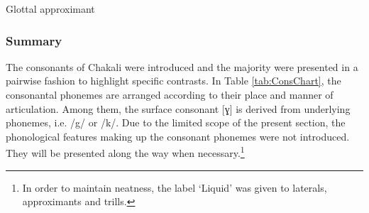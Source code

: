 
\begin{table} 

\caption{Glottal  approximant\label{tab:glot-approx}}

\quad
{}
\end{table}




\newpage 
\subsubsection{Summary} 
\label{sec:sum-consonant}

The consonants of Chakali were introduced and the majority were
presented in a pairwise fashion to highlight specific contrasts. In Table
\ref{tab:ConsChart},  the  consonantal phonemes are arranged according to their
place and manner of articulation. Among them,  the surface consonant [ɣ] is 
derived from underlying phonemes, i.e. {/g/} or  { /k/}.   Due to the
limited scope of the present section,  the phonological
features making up the consonant phonemes were not introduced. They will be
presented along the way
when necessary.\footnote{In order to maintain neatness, the label `Liquid' was given to laterals, approximants and trills.}


